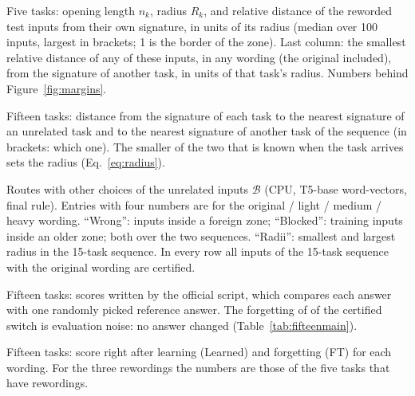 \begin{table}[h]
  \caption{Five tasks: opening length $n_k$, radius $R_k$, and relative distance of the reworded
  test inputs from their own signature, in units of its radius (median over 100 inputs, largest in brackets; 1 is the border of
  the zone). Last column: the smallest relative distance of any of these inputs, in any wording
  (the original included), from the signature of another task, in units of that task's radius. Numbers behind Figure~\ref{fig:margins}.}
  \label{tab:geometry}
  \centering
    \footnotesize
  \setlength{\tabcolsep}{3pt}
  
\end{table}

\begin{table}[h]
  \caption{Fifteen tasks: distance from the signature of each task to the nearest signature of an
  unrelated task and to the nearest signature of another task of the sequence (in brackets: which
  one). The smaller of the two that is known when the task arrives sets the radius
  (Eq.~\ref{eq:radius}).}
  \label{tab:distances}
  \centering
  \small
  
\end{table}

\begin{table}[h]
  \caption{Routes with other choices of the unrelated inputs $\mathcal{B}$ (CPU, T5-base
  word-vectors, final rule). Entries with four numbers are for the original / light / medium /
  heavy wording. ``Wrong'': inputs inside a foreign zone; ``Blocked'': training inputs inside an
  older zone; both over the two sequences. ``Radii'': smallest and largest radius in the 15-task
  sequence. In every row all inputs of the 15-task sequence with the original wording are
  certified.}
  \label{tab:background}
  \centering
  \footnotesize
  \setlength{\tabcolsep}{3pt}
  
\end{table}

\begin{table}[h]
  \caption{Fifteen tasks: scores written by the official script, which compares each answer with one
  randomly picked reference answer. The forgetting of \FifteenCertOffFT{} of the certified switch is
  evaluation noise: no answer changed (Table~\ref{tab:fifteenmain}).}
  \label{tab:fifteenofficial}
  \centering
  \small
  
\end{table}

\begin{table}[h]
  \caption{Fifteen tasks: score right after learning (Learned) and forgetting (FT) for each wording.
  For the three rewordings the numbers are those of the five tasks that have rewordings.}
  \label{tab:fifteenmore}
  \centering
  \small
  
\end{table}

